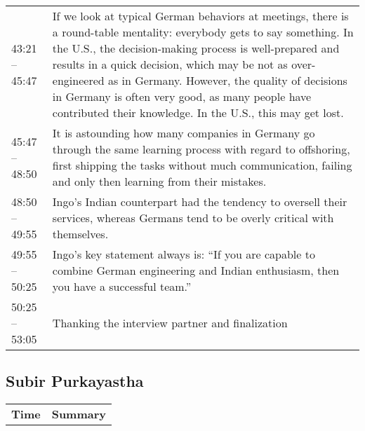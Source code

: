 \begin{appendix}
\begin{longtable}{l p{12.5cm}}
	43:21 -- 45:47&If we look at typical German behaviors at meetings, there is a round-table mentality: everybody gets to say something. In the U.S., the decision-making process is well-prepared and results in a quick decision, which may be not as over-engineered as in Germany. However, the quality of decisions in Germany is often very good, as many people have contributed their knowledge. In the U.S., this may get lost.\\
	45:47 -- 48:50& It is astounding how many companies in Germany go through the same learning process with regard to offshoring, first shipping the tasks without much communication, failing and only then learning from their mistakes.\\
	48:50 -- 49:55&Ingo's Indian counterpart had the tendency to oversell their services, whereas Germans tend to be overly critical with themselves.\\
	49:55 -- 50:25& Ingo's key statement always is: ``If you are capable to combine German engineering and Indian enthusiasm, then you have a successful team.''\\
	50:25 -- 53:05& Thanking the interview partner and finalization\\
\end{longtable}

\newpage
\tocless\subsection{Subir Purkayastha}

\begin{longtable}{l p{12.5cm}}
	\textbf{Time} & \textbf{Summary} \\ 
	
\end{longtable}	

\end{appendix}	